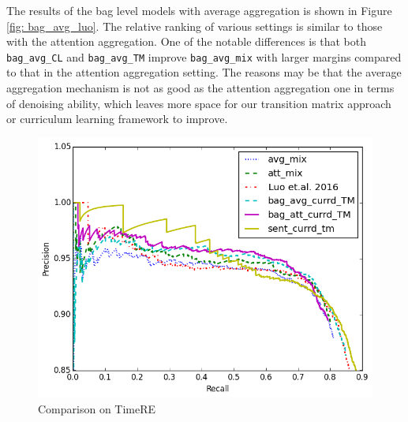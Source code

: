 The results of the bag level models with average aggregation is shown in Figure \ref{fig: bag_avg_luo}. The relative ranking of various settings is similar to those with the attention aggregation.  One of the notable differences is that both \texttt{bag\_avg\_CL} and \texttt{bag\_avg\_TM} improve \texttt{bag\_avg\_mix} with larger margins compared to that in the attention aggregation setting. The reasons may be that the average aggregation mechanism is not as good as the attention aggregation one in terms of denoising ability, which leaves more space for our transition matrix approach or curriculum learning framework to improve.

\begin{figure}[htbp]
\begin{center}
\includegraphics[width=0.9\linewidth]{figures/best_cmp_exp_overall.png}
\caption{Comparison on TimeRE}
\label{fig: cmp_luo}
\end{center}
\end{figure}

